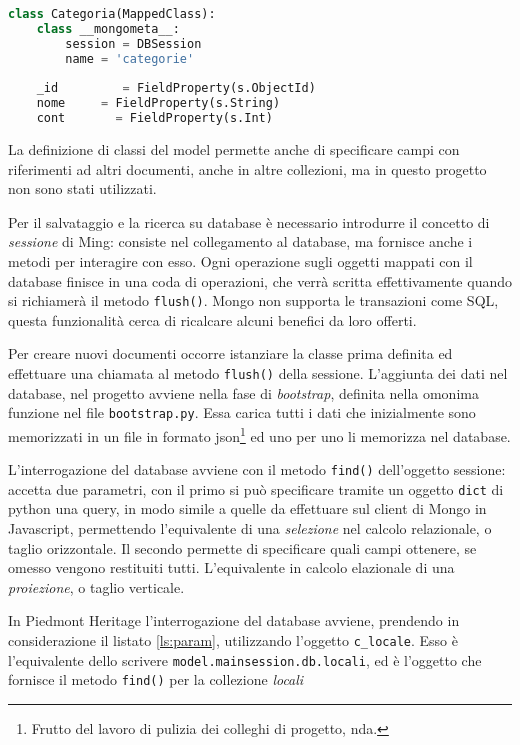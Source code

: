 \begin{lstlisting}[label=ls:mingclass,caption={Classe della collezione di categorie, con i campi sa salace sul database.},language=Python]
class Categoria(MappedClass):
    class __mongometa__:
        session = DBSession
        name = 'categorie'
        
    _id         = FieldProperty(s.ObjectId)
    nome     = FieldProperty(s.String)
    cont       = FieldProperty(s.Int)
\end{lstlisting}

La definizione di classi del model permette anche di specificare campi con riferimenti ad altri documenti, anche in altre collezioni, ma in questo progetto non sono stati utilizzati.

Per il salvataggio e la ricerca su database è necessario introdurre il concetto di \emph{sessione} di Ming: consiste nel collegamento al database, ma fornisce anche i metodi per interagire con esso. Ogni operazione sugli oggetti mappati con il database finisce in una coda di operazioni, che verrà scritta effettivamente quando si richiamerà il metodo \texttt{flush()}. Mongo non supporta le transazioni come SQL, questa funzionalità cerca di ricalcare alcuni benefici da loro offerti.

Per creare nuovi documenti occorre istanziare la classe prima definita ed effettuare una chiamata al metodo \texttt{flush()} della sessione. L'aggiunta dei dati nel database, nel progetto avviene nella fase di \emph{bootstrap}, definita nella omonima funzione nel file \texttt{bootstrap.py}. Essa carica tutti i dati che inizialmente sono memorizzati in un file in formato json\footnote{Frutto del lavoro di pulizia dei colleghi di progetto, nda.} ed uno per uno li memorizza nel database.

L'interrogazione del database avviene con il metodo \texttt{find()} dell'oggetto sessione: accetta due parametri, con il primo si può specificare tramite un oggetto \texttt{dict} di python una query, in modo simile a quelle da effettuare sul client di Mongo in Javascript, permettendo l'equivalente di una \emph{selezione} nel calcolo relazionale, o taglio orizzontale. Il secondo permette di specificare quali campi ottenere, se omesso vengono restituiti tutti. L'equivalente in calcolo elazionale di una \emph{proiezione}, o taglio verticale.

In Piedmont Heritage l'interrogazione del database avviene, prendendo in considerazione il listato \ref{ls:param}, utilizzando l'oggetto \texttt{c\_locale}. Esso è l'equivalente dello scrivere \texttt{model.mainsession.db.locali}, ed è l'oggetto che fornisce il metodo \texttt{find()} per la collezione \emph{locali}


